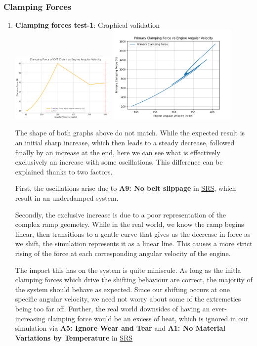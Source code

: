 \documentclass[12pt, titlepage]{article}
\begin{document}
\subsubsection{Clamping Forces}
\begin{enumerate}
\item{\textbf{Clamping forces test-1}: Graphical validation}\\

\includegraphics[width=0.4\textwidth]{theoretical-figures/clamp_force.png}
\includegraphics[width=0.5\textwidth]{simulation-figures/primary_clamping.png}

The shape of both graphs above do not match. While the expected result is an initial sharp increase, which then leads to a steady decrease, followed finally by an increase at the end, here we can see what is effectively exclusively an increase with some oscillations. This difference can be explained thanks to two factors.

First, the oscillations arise due to \textbf{A9: No belt slippage} in \href{https://github.com/gr812b/CVT-Simulator/blob/develop/docs/SRS/SRS.pdf}{SRS}, which result in an underdamped system. 

Secondly, the exclusive increase is due to a poor representation of the complex ramp geometry. While in the real world, we know the ramp begins linear, then transitions to a gentle curve that gives us the decrease in force as we shift, the simulation represents it as a linear line. This causes a more strict rising of the force at each corresponding angular velocity of the engine.

The impact this has on the system is quite miniscule. As long as the initla clamping forces which drive the shifting behaviour are correct, the majority of the system should behave as expected. Since our shifting occurs at one specific angular velocity, we need not worry about some of the extremeties being too far off. Further, the real world downsides of having an ever-increasing clamping force would be an excess of heat, which is ignored in our simulation via \textbf{A5: Ignore Wear and Tear} and \textbf{A1: No Material Variations by Temperature} in \href{https://github.com/gr812b/CVT-Simulator/blob/develop/docs/SRS/SRS.pdf}{SRS}

\end{enumerate}
\end{document}
